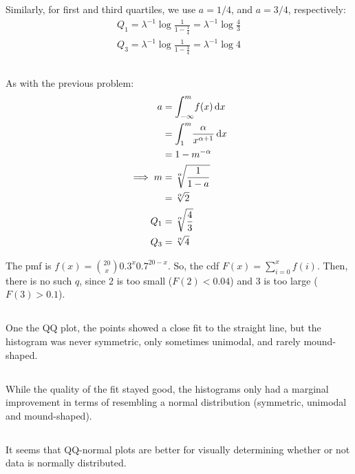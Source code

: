 \documentclass[twocolumn]{article}
\begin{document}
Similarly, for first and third quartiles, we use $a=1/4$, and $a=3/4$, respectively:\begin{align*}
Q_1=\lambda^{-1}\log\frac{1}{1-\frac{1}{4}}=\lambda^{-1}\log\frac{4}{3}\\
Q_3=\lambda^{-1}\log\frac{1}{1-\frac{3}{4}}=\lambda^{-1}\log 4
\end{align*}

\subsection{}
As with the previous problem:\begin{align*}
a	& = \int_{-\infty}^{m} \! f(x) \, \mathrm{d} x	\\
	&= \int_{1}^{m} \! \frac{\alpha }{x^{\alpha +1}} \, \mathrm{d} x \\
	&= 1-m^{-\alpha}\\
\implies m &= \sqrt[\alpha]{\frac{1}{1-a}}\\
&= \sqrt[\alpha]{2} \\
Q_1 &= \sqrt[\alpha]{\frac{4}{3}}\\
Q_3 &= \sqrt[\alpha]{4}
\end{align*}

The pmf is $f(x)=\binom{20}{x}0.3^x0.7^{20-x}$. So, the cdf $F(x)=\sum_{i=0}^xf(i)$. Then, there is no such $q$, since 2 is too small ($F(2)<0.04$) and 3 is too large ($F(3)>0.1$).

\subsection{}
One the QQ plot, the points showed a close fit to the straight line, but the histogram was never symmetric, only sometimes unimodal, and rarely mound-shaped.
\subsection{}
While the quality of the fit stayed good, the histograms only had a marginal improvement in terms of resembling a normal distribution (symmetric, unimodal and mound-shaped).
\subsection{}
It seems that QQ-normal plots are better for visually determining whether or not data is normally distributed.
\end{document}
